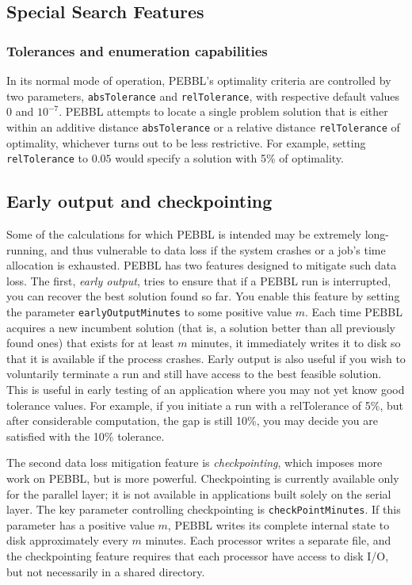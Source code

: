\subsection{Special Search Features}

\subsubsection{Tolerances and enumeration capabilities}

In its normal mode of operation, PEBBL's optimality criteria are
controlled by two parameters, \texttt{absTolerance} and
\texttt{relTolerance}, with respective default values $0$ and
$10^{-7}$. PEBBL attempts to locate a single problem solution that is
either within an additive distance \texttt{absTolerance} or a relative
distance \texttt{relTolerance} of optimality, whichever turns out to
be less restrictive.  For example, setting \texttt{relTolerance} to
$0.05$ would specify a solution with 5\% of optimality.

\subsection{Early output and checkpointing}

Some of the calculations for which PEBBL is intended may be extremely
long-running, and thus vulnerable to data loss if the system crashes
or a job's time allocation is exhausted.  PEBBL has two features
designed to mitigate such data loss.  The first, \emph{early output},
tries to ensure that if a PEBBL run is interrupted, you can recover
the best solution found so far.  You enable this feature by setting
the parameter \texttt{earlyOutputMinutes} to some positive value $m$.
Each time PEBBL acquires a new incumbent solution (that is, a solution
better than all previously found ones) that exists for at least $m$
minutes, it immediately writes it to disk so that it is available if
the process crashes. Early output is also useful if you wish to
voluntarily terminate a run and still have access to the best feasible
solution.  This is useful in early testing of an application where you
may not yet know good tolerance values.  For example, if you initiate
a run with a relTolerance of 5\%, but after considerable computation,
the gap is still 10\%, you may decide you are satisfied with the 10\%
tolerance.

The second data loss mitigation feature is \emph{checkpointing}, which
imposes more work on PEBBL, but is more powerful.  Checkpointing is
currently available only for the parallel layer; it is not available
in applications built solely on the serial layer.  The key parameter
controlling checkpointing is \texttt{checkPointMinutes}.  If this
parameter has a positive value $m$, PEBBL writes its complete
internal state to disk approximately every $m$ minutes. Each processor
writes a separate file, and the checkpointing feature requires that
each processor have access to disk I/O, but not necessarily in a
shared directory.


